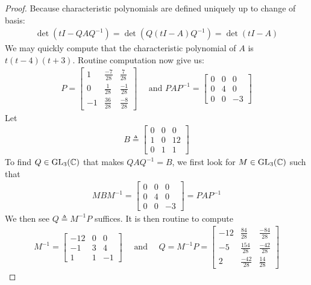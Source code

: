 \documentclass{report}
\begin{document}
\begin{proof}
Because characteristic polynomials are defined uniquely up to change of basis:
\begin{align*}
\operatorname{det}(tI- QAQ^{-1})=\operatorname{det}(Q(tI-A)Q^{-1})= \operatorname{det}(tI-A)
\end{align*}
We may quickly compute that the characteristic polynomial of $A$ is $t(t-4)(t+3)$. Routine computation now give us:  
\begin{align*}
P = \begin{bmatrix}
  1 &  \frac{-7}{28} & \frac{7}{28} \\
  0 & \frac{1}{28} & \frac{-1}{28} \\
  -1 & \frac{36}{28} & \frac{-8}{28}
\end{bmatrix}\quad  \text{ and }PAP^{-1}=\begin{bmatrix} 
  0 & 0 & 0 \\
  0 & 4 & 0 \\
  0 & 0 & -3 
\end{bmatrix}
\end{align*}
Let 
\begin{align*}
B\triangleq \begin{bmatrix}
  0 & 0 & 0 \\
  1 & 0 & 12 \\
  0 & 1 & 1
\end{bmatrix}
\end{align*}
To find $Q\in \operatorname{GL}_3(\mathbb{C})$ that makes $QAQ^{-1}=B$, we first look for $M \in \operatorname{GL}_3(\mathbb{C})$ such that 
\begin{align*}
MBM^{-1}= \begin{bmatrix}
  0 & 0 & 0 \\
  0 & 4 & 0 \\
  0 & 0 & -3 
\end{bmatrix}= PAP^{-1}
\end{align*}
We then see $Q\triangleq M^{-1}P $ suffices. It is then routine to compute 
\begin{align*}
M^{-1}= \begin{bmatrix}
  -12 & 0 & 0 \\
  -1 & 3 & 4 \\
  1 & 1 & -1
\end{bmatrix} \quad \text{ and }\quad Q= M^{-1}P = \begin{bmatrix}
  -12 & \frac{84}{28} & \frac{-84}{28} \\
  -5 &  \frac{154}{28} & \frac{-42}{28} \\
  2 & \frac{-42}{28} & \frac{14}{28} 
\end{bmatrix}
\end{align*}
\end{proof}
\end{document}
